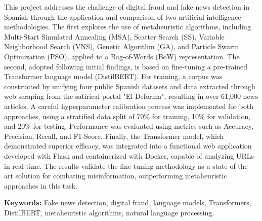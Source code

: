 This project addresses the challenge of digital fraud and fake news detection in Spanish through the application and comparison of two artificial intelligence methodologies. The first explores the use of metaheuristic algorithms, including Multi-Start Simulated Annealing (MSA), Scatter Search (SS), Variable Neighborhood Search (VNS), Genetic Algorithm (GA), and Particle Swarm Optimization (PSO), applied to a Bag-of-Words (BoW) representation. The second, adopted following initial findings, is based on fine-tuning a pre-trained Transformer language model (DistilBERT). For training, a corpus was constructed by unifying four public Spanish datasets and data extracted through web scraping from the satirical portal "El Deforma", resulting in over 61,000 news articles. A careful hyperparameter calibration process was implemented for both approaches, using a stratified data split of 70\% for training, 10\% for validation, and 20\% for testing. Performance was evaluated using metrics such as Accuracy, Precision, Recall, and F1-Score. Finally, the Transformer model, which demonstrated superior efficacy, was integrated into a functional web application developed with Flask and containerized with Docker, capable of analyzing URLs in real-time. The results validate the fine-tuning methodology as a state-of-the-art solution for combating misinformation, outperforming metaheuristic approaches in this task.

\vspace{0.9cm}
\textbf{Keywords:} Fake news detection, digital fraud, language models, Transformers, DistilBERT, metaheuristic algorithms, natural language processing.

\shipout\null
